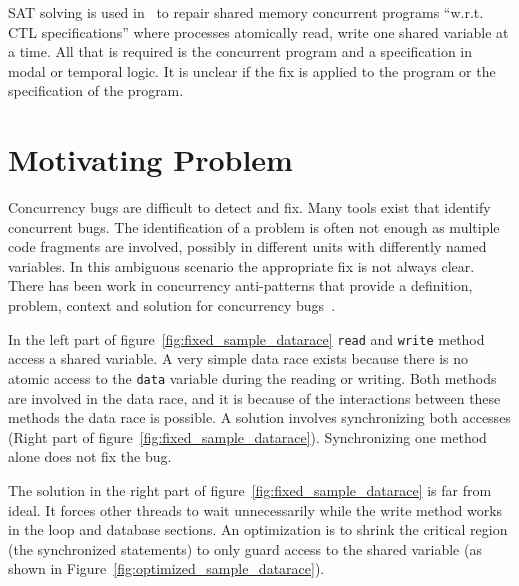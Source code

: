 \documentclass[10pt, conference, compsocconf]{IEEEtran}
\begin{document}
SAT solving is used in~\cite{AY07}  to repair shared memory concurrent programs
``w.r.t. CTL specifications'' where processes atomically read, write one shared
variable at a time. All that is required is the concurrent program and a
specification in modal or temporal logic. It is unclear if the fix is applied
to the program or the specification of the program.

\section{Motivating Problem}
\label{sec:motivation}

Concurrency bugs are difficult to detect and fix. Many
tools exist that identify concurrent bugs. The identification of a problem is
often not enough as multiple code fragments are involved, possibly in different
units with differently named variables. In this ambiguous scenario the 
appropriate fix is not always clear. There has been work in concurrency 
anti-patterns that provide a definition, problem, context and solution for 
concurrency bugs~\cite{BJ09}.

In the left part of figure~\ref{fig:fixed_sample_datarace} \texttt{read} and
\texttt{write} method access a shared variable. A very simple data race
exists because there is no atomic
access to the \texttt{data} variable during the reading or writing. Both
methods are involved in the data race, and it is because of the interactions 
between these methods the data race is possible. A solution involves 
synchronizing both accesses (Right part of figure~\ref{fig:fixed_sample_datarace}). 
Synchronizing one method alone does not fix the bug.

The solution in the right part of figure~\ref{fig:fixed_sample_datarace} is far
from ideal. It forces other threads to wait unnecessarily while the write method works in the loop and database
sections. An optimization is to shrink the critical region (the synchronized
statements) to only guard access to the shared variable (as shown in
Figure~\ref{fig:optimized_sample_datarace}).
\end{document}
